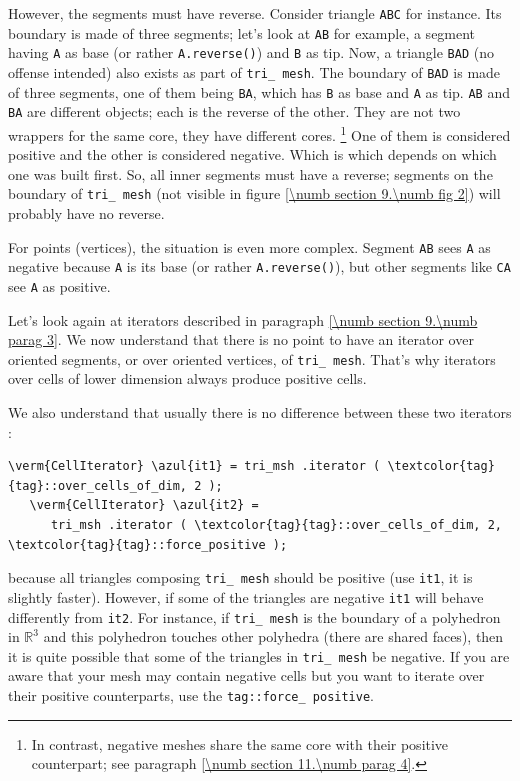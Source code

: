 However, the segments must have reverse.
Consider triangle {\small\tt ABC} for instance.
Its boundary is made of three segments; let's look at {\small\tt AB} for example,
a segment having {\small\tt A} as base (or rather {\small\tt A.reverse()}) and
{\small\tt B} as tip.
Now, a triangle {\small\tt BAD} (no offense intended) also exists as part of
{\small\tt tri\_\,mesh}.
The boundary of {\small\tt BAD} is made of three segments, one of them being {\small\tt BA},
which has {\small\tt B} as base and {\small\tt A} as tip.
{\small\tt AB} and {\small\tt BA} are different {\small\tt {}} objects;
each is the reverse of the other.
They are not two wrappers for the same core, they have different cores.%
\footnote {In contrast, negative meshes share the same core with their positive
counterpart; see paragraph \ref{\numb section 11.\numb parag 4}.}
One of them is considered positive and the other is considered negative.
Which is which depends on which one was built first.
So, all inner segments must have a reverse;
segments on the boundary of {\small\tt tri\_\,mesh} (not visible in figure
\ref{\numb section 9.\numb fig 2}) will probably have no reverse.

For points (vertices), the situation is even more complex.
Segment {\small\tt AB} sees {\small\tt A} as negative because {\small\tt A} is its base
(or rather {\small\tt A.reverse()}),
but other segments like {\small\tt CA} see {\small\tt A} as positive.

Let's look again at iterators described in paragraph \ref{\numb section 9.\numb parag 3}.
We now understand that there is no point to have an iterator over oriented
segments, or over oriented vertices, of {\small\tt tri\_\,mesh}.
That's why iterators over cells of lower dimension always produce positive cells.

We also understand that usually there is no difference between these two iterators :

\begin{Verbatim}[commandchars=\\\{\},formatcom=\small\tt,
   baselinestretch=0.94,framesep=2mm                      ]
   \verm{CellIterator} \azul{it1} = tri_msh .iterator ( \textcolor{tag}{tag}::over_cells_of_dim, 2 );
   \verm{CellIterator} \azul{it2} =
      tri_msh .iterator ( \textcolor{tag}{tag}::over_cells_of_dim, 2, \textcolor{tag}{tag}::force_positive );
\end{Verbatim}

\noindent because all triangles composing {\small\tt tri\_\,mesh} should be positive
(use {\small\tt it1}, it is slightly faster).
However, if some of the triangles are negative {\small\tt it1} will behave differently from
{\small\tt it2}.
For instance, if {\small\tt tri\_\,mesh} is the boundary of a polyhedron in $ \mathbb{R}^3 $
and this polyhedron touches other polyhedra (there are shared faces), then it is
quite possible that some of the triangles in {\small\tt tri\_\,mesh} be negative.
If you are aware that your mesh may contain negative cells but
you want to iterate over their positive counterparts, use the {\small\tt \textcolor{tag}{tag}::force\_\,positive}.

